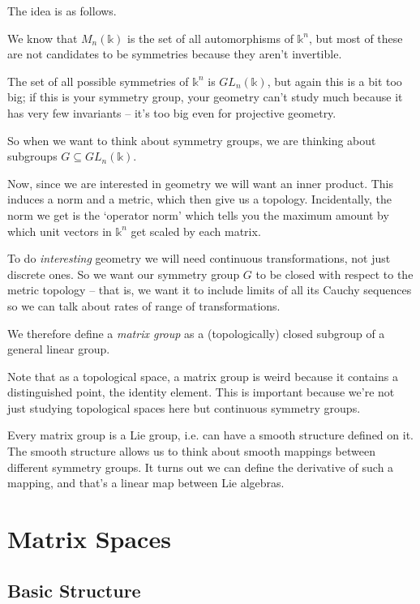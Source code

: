 \documentclass[oneside,english]{amsbook}
\numberwithin{section}{chapter}
\theoremstyle{plain}
\theoremstyle{definition}
\begin{document}
The idea is as follows. 

We know that $M_n(\mathbb{k})$ is the set of all automorphisms of $\mathbb{k}^n$, but most of these are not candidates to be symmetries because they aren't invertible.

The set of all possible symmetries of $\mathbb{k}^n$ is $GL_n(\mathbb{k})$, but again this is a bit too big; if this is your symmetry group, your geometry can't study much because it has very few invariants -- it's too big even for projective geometry.

So when we want to think about symmetry groups, we are thinking about subgroups $G\subseteq GL_n(\mathbb{k})$. 

Now, since we are interested in geometry we will want an inner product. This induces a norm and a metric, which then give us a topology. Incidentally, the norm we get is the `operator norm' which tells you the maximum amount by which unit vectors in $\mathbb{k}^n$ get scaled by each matrix.

To do \emph{interesting} geometry we will need continuous transformations, not just discrete ones. So we want our symmetry group $G$ to be closed with respect to the metric topology -- that is, we want it to include limits of all its Cauchy sequences so we can talk about rates of range of transformations.

We therefore define a \emph{matrix group} as a (topologically) closed subgroup of a general linear group.

Note that as a topological space, a matrix group is weird because it contains a distinguished point, the identity element. This is important because we're not just studying topological spaces here but continuous symmetry groups.

Every matrix group is a Lie group, i.e. can have a smooth structure defined on it. The smooth structure allows us to think about smooth mappings between different symmetry groups. It turns out we can define the derivative of such a mapping, and that's a linear map between Lie algebras.

\section{Matrix Spaces}

\subsection{Basic Structure}
\end{document}
